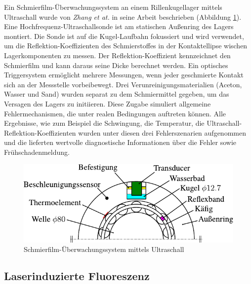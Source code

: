 Ein Schmierfilm-Überwachungssystem an einem Rillenkugellager mittels Ultraschall wurde von \textit{Zhang et at.} in seine Arbeit \cite{zhang_2006} beschrieben (Abbildung \ref{fig:ultrashall_rikula_zhang}).
Eine Hochfrequenz-Ultraschallsonde ist am statischen Außenring des Lagers montiert.
Die Sonde ist auf die Kugel-Laufbahn fokussiert und wird verwendet, um die Reflektion-Koeffizienten des Schmierstoffes in der Kontaktellipse wischen Lagerkomponenten zu messen.
Der Reflektion-Koeffizient kennzeichnet den Schmierfilm und kann daraus seine Dicke berechnet werden.
Ein optisches Triggersystem ermöglicht mehrere Messungen, wenn jeder geschmierte Kontakt sich an der Messstelle vorbeibewegt.
Drei Verunreinigungsmaterialien (Aceton, Wasser und Sand) wurden separat zu dem Schmiermittel gegeben, um das Versagen des Lagers zu initiieren.
Diese Zugabe simuliert allgemeine Fehlermechanismen, die unter realen Bedingungen auftreten können.
    Alle Ergebnisse, wie zum Beispiel die Schwingung, die Temperatur, die Ultraschall-Reflektion-Koeffizienten wurden unter diesen drei Fehlerszenarien aufgenommen und die lieferten wertvolle diagnostische Informationen über die Fehler sowie Frühschadenmeldung.
\begin{figure}[htb]
    \centering
    \includegraphics[]{./images/ultrashall_rikula_zhang.pdf}
    \caption{Schmierfilm-Überwachungssystem mittels Ultraschall \cite{zhang_2006}}
    \label{fig:ultrashall_rikula_zhang}
\end{figure}
%

\subsection{Laserinduzierte Fluoreszenz}
\label{sub:laserinduzierte_fluoreszenz}


